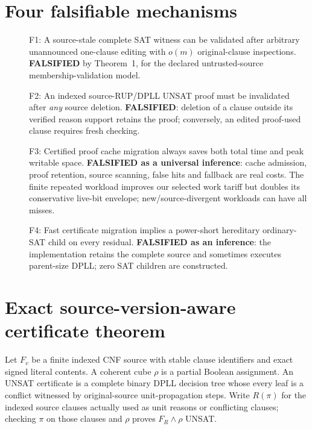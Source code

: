 \documentclass[11pt]{article}
\begin{document}
\section{Four falsifiable mechanisms}
\begin{description}
\item[] F1: A source-stale complete SAT witness can be validated after arbitrary unannounced one-clause editing with $o(m)$ original-clause inspections. \textbf{FALSIFIED} by Theorem~1, for the declared untrusted-source membership-validation model.
\item[] F2: An indexed source-RUP/DPLL UNSAT proof must be invalidated after \emph{any} source deletion. \textbf{FALSIFIED}: deletion of a clause outside its verified reason support retains the proof; conversely, an edited proof-used clause requires fresh checking.
\item[] F3: Certified proof cache migration always saves both total time and peak writable space. \textbf{FALSIFIED as a universal inference}: cache admission, proof retention, source scanning, false hits and fallback are real costs. The finite repeated workload improves our selected work tariff but doubles its conservative live-bit envelope; new/source-divergent workloads can have all misses.
\item[] F4: Fast certificate migration implies a power-short hereditary ordinary-SAT child on every residual. \textbf{FALSIFIED as an inference}: the implementation retains the complete source and sometimes executes parent-size DPLL; zero SAT children are constructed.
\end{description}

\section{Exact source-version-aware certificate theorem}
Let $F_v$ be a finite indexed CNF source with stable clause identifiers and exact signed literal contents. A coherent cube $\rho$ is a partial Boolean assignment. An UNSAT certificate is a complete binary DPLL decision tree whose every leaf is a conflict witnessed by original-source unit-propagation steps. Write $R(\pi)$ for the indexed source clauses actually used as unit reasons or conflicting clauses; checking $\pi$ on those clauses and $\rho$ proves $F_R\wedge\rho$ UNSAT.
\end{document}
